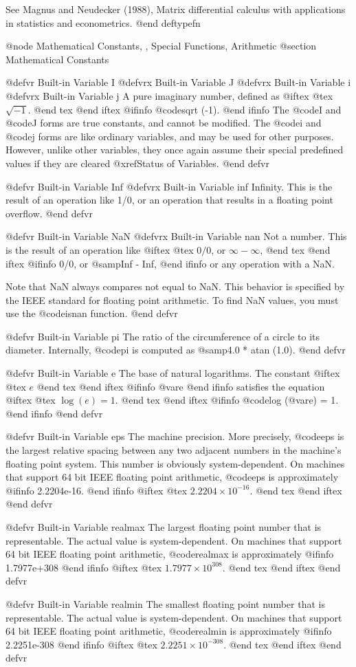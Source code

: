See Magnus and Neudecker (1988), Matrix differential calculus with
applications in statistics and econometrics.
@end deftypefn

@node Mathematical Constants,  , Special Functions, Arithmetic
@section Mathematical Constants

@defvr {Built-in Variable} I
@defvrx {Built-in Variable} J
@defvrx {Built-in Variable} i
@defvrx {Built-in Variable} j
A pure imaginary number, defined as
@iftex
@tex
  $\sqrt{-1}$.
@end tex
@end iftex
@ifinfo
  @code{sqrt (-1)}.
@end ifinfo
The @code{I} and @code{J} forms are true constants, and cannot be
modified.  The @code{i} and @code{j} forms are like ordinary variables,
and may be used for other purposes.  However, unlike other variables,
they once again assume their special predefined values if they are
cleared @xref{Status of Variables}.
@end defvr

@defvr {Built-in Variable} Inf
@defvrx {Built-in Variable} inf
Infinity.  This is the result of an operation like 1/0, or an operation
that results in a floating point overflow.
@end defvr

@defvr {Built-in Variable} NaN
@defvrx {Built-in Variable} nan
Not a number.  This is the result of an operation like
@iftex
@tex
$0/0$, or $\infty - \infty$,
@end tex
@end iftex
@ifinfo
0/0, or @samp{Inf - Inf},
@end ifinfo
or any operation with a NaN.

Note that NaN always compares not equal to NaN.  This behavior is
specified by the IEEE standard for floating point arithmetic.  To
find NaN values, you must use the @code{isnan} function.
@end defvr

@defvr {Built-in Variable} pi
The ratio of the circumference of a circle to its diameter.
Internally, @code{pi} is computed as @samp{4.0 * atan (1.0)}.
@end defvr

@defvr {Built-in Variable} e
The base of natural logarithms.  The constant
@iftex
@tex
 $e$
@end tex
@end iftex
@ifinfo
 @var{e}
@end ifinfo
 satisfies the equation
@iftex
@tex
 $\log (e) = 1$.
@end tex
@end iftex
@ifinfo
 @code{log} (@var{e}) = 1.
@end ifinfo
@end defvr

@defvr {Built-in Variable} eps
The machine precision.  More precisely, @code{eps} is the largest
relative spacing between any two adjacent numbers in the machine's
floating point system.  This number is obviously system-dependent.  On
machines that support 64 bit IEEE floating point arithmetic, @code{eps}
is approximately
@ifinfo
 2.2204e-16.
@end ifinfo
@iftex
@tex
 $2.2204\times10^{-16}$.
@end tex
@end iftex
@end defvr

@defvr {Built-in Variable} realmax
The largest floating point number that is representable.  The actual
value is system-dependent.  On machines that support 64 bit IEEE
floating point arithmetic, @code{realmax} is approximately
@ifinfo
 1.7977e+308
@end ifinfo
@iftex
@tex
 $1.7977\times10^{308}$.
@end tex
@end iftex
@end defvr

@defvr {Built-in Variable} realmin
The smallest floating point number that is representable.  The actual
value is system-dependent.  On machines that support 64 bit IEEE
floating point arithmetic, @code{realmin} is approximately
@ifinfo
 2.2251e-308
@end ifinfo
@iftex
@tex
 $2.2251\times10^{-308}$.
@end tex
@end iftex
@end defvr
